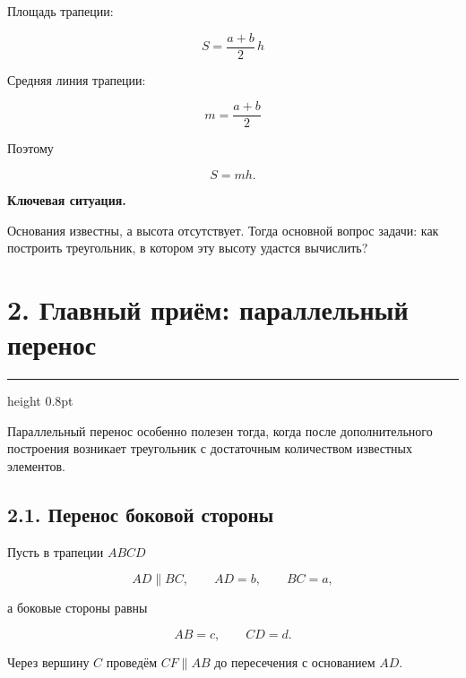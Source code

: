 \documentclass[a4paper,12pt]{article}
\newcommand{\sectionline}{
  \par
  \vspace{0.2em}
  {\color{accent}\hrule height 0.8pt}
  \vspace{0.7em}
}
\newcommand{\important}[1]{
  \textbf{\color{darkaccent}#1}
}
\newcommand{\formula}[1]{
  \[
  \boxed{#1}
  \]
}
\begin{document}
Площадь трапеции:

\formula{
S=\frac{a+b}{2}\,h
}

Средняя линия трапеции:

\formula{
m=\frac{a+b}{2}
}

Поэтому

\[
S=mh.
\]

\important{Ключевая ситуация.}
Основания известны, а высота отсутствует. Тогда основной вопрос задачи:
как построить треугольник, в котором эту высоту удастся вычислить?


\section*{2. Главный приём: параллельный перенос}
\sectionline

Параллельный перенос особенно полезен тогда, когда после дополнительного
построения возникает треугольник с достаточным количеством известных
элементов.

\subsection*{2.1. Перенос боковой стороны}

Пусть в трапеции $ABCD$

\[
AD\parallel BC,
\qquad
AD=b,
\qquad
BC=a,
\]

а боковые стороны равны

\[
AB=c,
\qquad
CD=d.
\]

Через вершину $C$ проведём $CF\parallel AB$ до пересечения с основанием
$AD$.

\begin{center}
\end{center}
\end{document}
